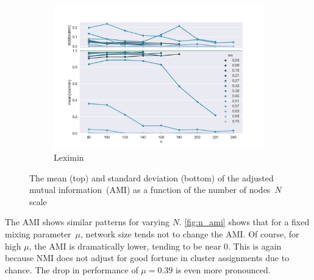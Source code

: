 \begin{figure}
    \begin{subfigure}[b]{0.32\textwidth}
        \includegraphics[width=\textwidth]{fig/ami_vs_n_leximin}
        \caption{Leximin}
        \label{fig:mouse}
    \end{subfigure}

  \caption{The mean (top) and standard deviation (bottom) of the adjusted mutual information~(AMI) as a function of the number of nodes~$N$ scale}
  \label{fig:n_ami}
\end{figure}

The AMI shows similar patterns for varying $N$. \autoref{fig:n_ami} shows that for a fixed mixing parameter~$\mu$, network size tends not to change the AMI. Of course, for high $\mu$, the AMI is dramatically lower, tending to be near 0. This is again because NMI does not adjust for good fortune in cluster assignments due to chance. The drop in performance of $\mu=0.39$ is even more pronounced. 


